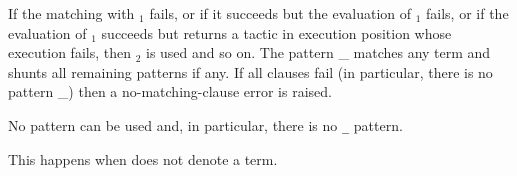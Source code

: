 If the matching with {\cpattern}$_1$ fails, or if it succeeds but the
evaluation of {\tacexpr}$_1$ fails, or if the evaluation of
{\tacexpr}$_1$ succeeds but returns a tactic in execution position
whose execution fails, then {\cpattern}$_2$ is used and so on.  The
pattern {\_} matches any term and shunts all remaining patterns if
any. If all clauses fail (in particular, there is no pattern {\_})
then a no-matching-clause error is raised.

\begin{ErrMsgs}

\item {}

  No pattern can be used and, in particular, there is no {\tt \_} pattern.

\item {}

  This happens when {\tacexpr} does not denote a term.

\end{ErrMsgs}

